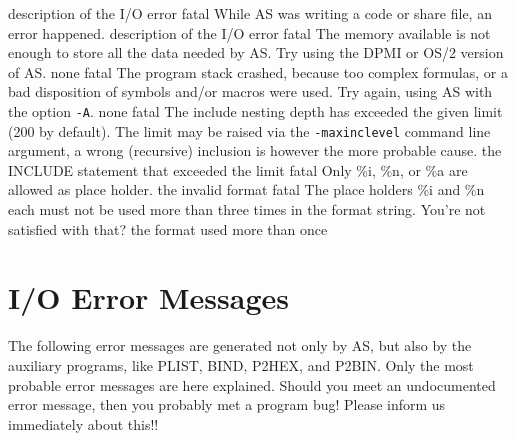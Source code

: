 \documentclass[12pt,twoside]{report}
\newcommand{\tty}[1]{{\tt #1}}
\newcommand{\asname}{{AS}}
\begin{document}
\begin{description}
               {description of the I/O error}
               {fatal}
               {While \asname{} was writing a code or share file, an error happened.}
               {description of the I/O error}
               {fatal}
               {The memory available is not enough to store all the data
                needed by \asname{}. Try using the DPMI or OS/2 version of \asname{}.}
               {none}
               {fatal}
               {The program stack crashed, because too complex formulas, or
                a bad disposition of symbols and/or macros were used. Try
                again, using \asname{} with the option \tty{-A}.}
               {none}
               {fatal}
               {The include nesting depth has exceeded the given limit (200
                by default). The limit may be raised via the {\tt -maxinclevel}
                command line argument, a wrong (recursive) inclusion is however
                the more probable cause.}
               {the INCLUDE statement that exceeded the limit}
               {fatal}
               {Only  \%i, \%n, or \%a are allowed as place holder.}
               {the invalid format}
               {fatal}
               {The place holders \%i and \%n each must not be used more than
                three times in the format string.  You're not satisfied with that?}
               {the format used more than once}
\end{description}


\cleardoublepage
\chapter{I/O Error Messages}

The following error messages are generated not only by \asname{}, but also by
the auxiliary programs, like PLIST, BIND, P2HEX, and P2BIN. Only the most
probable error messages are here explained. Should you meet an undocumented
error message, then you probably met a program bug! Please inform us
immediately about this!!
\end{document}
